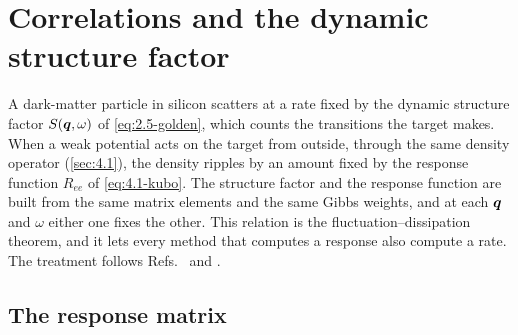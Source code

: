 \section{Correlations and the dynamic structure factor}\label{sec:4.2}

A dark-matter particle in silicon scatters at a rate fixed by the dynamic structure factor $S(\bm{q},\omega)$ of \cref{eq:2.5-golden}, which counts the transitions the target makes. When a weak potential acts on the target from outside, through the same density operator (\cref{sec:4.1}), the density ripples by an amount fixed by the response function $R_{ee}$ of \cref{eq:4.1-kubo}. The structure factor and the response function are built from the same matrix elements and the same Gibbs weights, and at each $\bm{q}$ and $\omega$ either one fixes the other. This relation is the fluctuation--dissipation theorem, and it lets every method that computes a response also compute a rate. The treatment follows Refs.~\cite[Chaps.~3 and 4]{giuliani2005quantum} and \cite[Chap.~2]{pines1966theory}.

\subsection{The response matrix}

